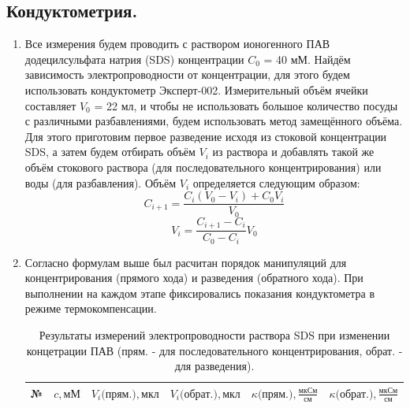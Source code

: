 \documentclass[a4paper, 11pt]{article}%
\begin{document}
\subsection{Кондуктометрия.}
\begin{enumerate}
    \item Все измерения будем проводить с раствором ионогенного ПАВ додецилсульфата натрия (SDS) концентрации $C_{0}$ = 40 мМ. Найдём зависимость электропроводности от концентрации, для этого будем использовать кондуктометр Эксперт-002. Измерительный объём ячейки составляет $V_{0}$ = 22 мл, и чтобы не использовать большое количество посуды с различными разбавлениями, будем использовать метод замещённого объёма. Для этого приготовим первое разведение исходя из стоковой концентрации SDS, а затем будем отбирать объём $V_{i}$ из раствора и добавлять такой же объём стокового раствора (для последовательного концентрирования) или воды (для разбавления). Объём $V_{i}$ определяется следующим образом:
    $$ C_{i+1} = \frac{C_{i}(V_{0}-V_{i})+C_{0}V_{i}}{V_{0}}$$
    $$ V_{i} = {\frac{C_{i+1}-C_{i}}{C_{0}-C_{i}}}V_{0}$$

    \item Согласно формулам выше был расчитан порядок манипуляций для концентрирования (прямого хода) и разведения (обратного хода). При выполнении на каждом этапе  фиксировались показания кондуктометра в режиме термокомпенсации. 

    \begin{table}[h!]
    \centering
    \caption{Результаты измерений электропроводности раствора SDS при изменении концетрации ПАВ (прям. - для последовательного концентрирования, обрат. - для разведения).}
    \begin{tabular}{|l|l|l|l|l|l|}
    \hline
    № & $c, \text{мМ}$ & $V_{i}\text{(прям.)}, \text{мкл}$ & $V_{i}\text{(обрат.)}, \text{мкл}$   &$\kappa \text{(прям.)}, \frac{\text{мкСм}}{\text{см}}$  & $\kappa \text{(обрат.)}, \frac{\text{мкСм}}{\text{см}}$  \\ \hline
    

\end{tabular}
\end{table}
\end{enumerate}
\end{document}
